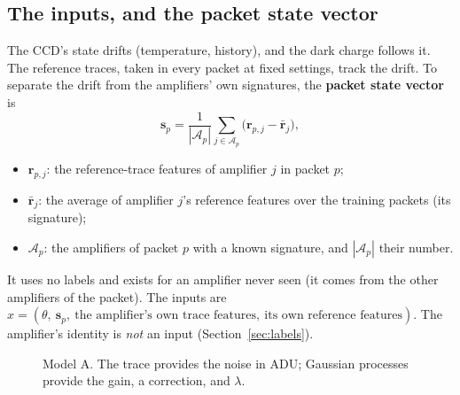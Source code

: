 \documentclass[11pt]{article}
\begin{document}
\subsection{The inputs, and the packet state vector}
The CCD's state drifts (temperature, history), and the dark charge follows it. The reference traces, taken in every packet at fixed
settings, track the drift. To separate the drift from the amplifiers' own signatures, the \textbf{packet state vector} is
\begin{equation}
\bm s_p = \frac{1}{|\mathcal A_p|}\sum_{j \in \mathcal A_p}\bigl(\bm r_{p,j} - \bar{\bm r}_j\bigr),
\end{equation}
\begin{itemize}
\item $\bm r_{p,j}$: the reference-trace features of amplifier $j$ in packet $p$;
\item $\bar{\bm r}_j$: the average of amplifier $j$'s reference features over the training packets (its signature);
\item $\mathcal A_p$: the amplifiers of packet $p$ with a known signature, and $|\mathcal A_p|$ their number.
\end{itemize}
It uses no labels and exists for an amplifier never seen (it comes from the other amplifiers of the packet). The inputs are
$x = (\theta,\ \bm s_p,\ \text{the amplifier's own trace features},\ \text{its own reference features})$. The amplifier's identity
is \emph{not} an input (Section~\ref{sec:labels}).

\begin{figure}[H]
\centering
{}
\caption{Model A. The trace provides the noise in ADU; Gaussian processes provide the gain, a correction, and $\lambda$.}
\end{figure}
\end{document}
